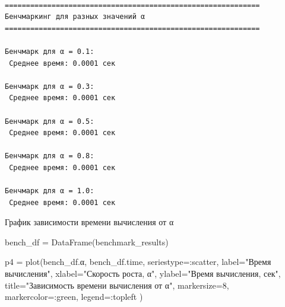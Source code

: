 \documentclass[
  12pt,
  a4paper,
  DIV=11,
  numbers=noendperiod]{scrreprt}
\newenvironment{Shaded}{\begin{snugshade}}{\end{snugshade}}
\newcommand{\FloatTok}[1]{\textcolor[rgb]{0.68,0.00,0.00}{#1}}
\newcommand{\FunctionTok}[1]{\textcolor[rgb]{0.28,0.35,0.67}{#1}}
\newcommand{\KeywordTok}[1]{\textcolor[rgb]{0.00,0.23,0.31}{#1}}
\newcommand{\NormalTok}[1]{\textcolor[rgb]{0.00,0.23,0.31}{#1}}
\newcommand{\OperatorTok}[1]{\textcolor[rgb]{0.37,0.37,0.37}{#1}}
\newcommand{\PreprocessorTok}[1]{\textcolor[rgb]{0.68,0.00,0.00}{#1}}
\newcommand{\SpecialCharTok}[1]{\textcolor[rgb]{0.37,0.37,0.37}{#1}}
\newcommand{\StringTok}[1]{\textcolor[rgb]{0.13,0.47,0.30}{#1}}
\begin{document}
\begin{Shaded}
\end{Shaded}

\begin{verbatim}

============================================================
Бенчмаркинг для разных значений α
============================================================

Бенчмарк для α = 0.1:
 Среднее время: 0.0001 сек

Бенчмарк для α = 0.3:
 Среднее время: 0.0001 сек

Бенчмарк для α = 0.5:
 Среднее время: 0.0001 сек

Бенчмарк для α = 0.8:
 Среднее время: 0.0001 сек

Бенчмарк для α = 1.0:
 Среднее время: 0.0001 сек
\end{verbatim}

График зависимости времени вычисления от α

\begin{Shaded}
\begin{Highlighting}[]
\NormalTok{bench\_df }\OperatorTok{=} \FunctionTok{DataFrame}\NormalTok{(benchmark\_results)}

\NormalTok{p4 }\OperatorTok{=} \FunctionTok{plot}\NormalTok{(bench\_df.α, bench\_df.time,}
\NormalTok{    seriestype}\OperatorTok{=:}\NormalTok{scatter,}
\NormalTok{    label}\OperatorTok{=}\StringTok{"Время вычисления"}\NormalTok{,}
\NormalTok{    xlabel}\OperatorTok{=}\StringTok{"Скорость роста, α"}\NormalTok{,}
\NormalTok{    ylabel}\OperatorTok{=}\StringTok{"Время вычисления, сек"}\NormalTok{,}
\NormalTok{    title}\OperatorTok{=}\StringTok{"Зависимость времени вычисления от α"}\NormalTok{,}
\NormalTok{    markersize}\OperatorTok{=}\FloatTok{8}\NormalTok{,}
\NormalTok{    markercolor}\OperatorTok{=:}\NormalTok{green,}
\NormalTok{    legend}\OperatorTok{=:}\NormalTok{topleft}
\NormalTok{)}
\end{Highlighting}
\end{Shaded}
\end{document}
